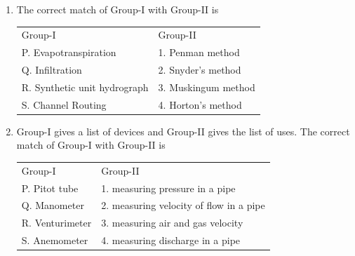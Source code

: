 \documentclass[journal,12pt,onecolumn]{IEEEtran}
\theoremstyle{remark}
\begin{document}
\begin{enumerate}
\hfill{}
\begin{enumerate}
\end{enumerate}
\noindent\item The correct match of Group-I with Group-II is
\hfill{}
\begin{table}[H]
\centering
\begin{tabular}{l l}
Group-I & Group-II \\
P. Evapotranspiration     & 1. Penman method \\
Q. Infiltration    & 2. Snyder’s method \\
R. Synthetic unit hydrograph    & 3. Muskingum method  \\
S. Channel Routing    & 4. Horton's method
\end{tabular}
\label{table1}
\end{table}

\begin{enumerate}
\end{enumerate}
\noindent\item Group-I gives a list of devices and Group-II gives the list of uses. The correct match of Group-I with Group-II is
\hfill{}

\begin{table}[H]
    \centering
\begin{tabular}{l l}
Group-I  & Group-II  \\
P. Pitot tube & 1. measuring pressure in a pipe \\
Q. Manometer   & 2. measuring velocity of flow in a pipe     \\
R. Venturimeter     & 3. measuring air and gas velocity          \\
S. Anemometer    & 4. measuring discharge in a pipe
\end{tabular}
\label{table2}
\end{table}


\end{enumerate}
\end{document}
